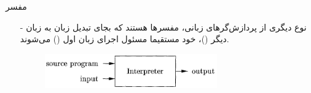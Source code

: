 \begin{frame}{مفسر}
\begin{itemize}\itemr
\item[-]
نوع دیگری از پردازش‌گر‌های زبانی، مفسرها هستند که بجای تبدیل زبان به زبان دیگر ()، خود مستقیما مسئول اجرای زبان اول () می‌شوند.
\vspace{5mm}
\begin{figure}[H]
\begin{center}
\includegraphics[width=0.7\textwidth, height=0.3\textheight, angle=0]{docs/images/interpreter}
\end{center}
\end{figure}
\end{itemize}
\end{frame}
